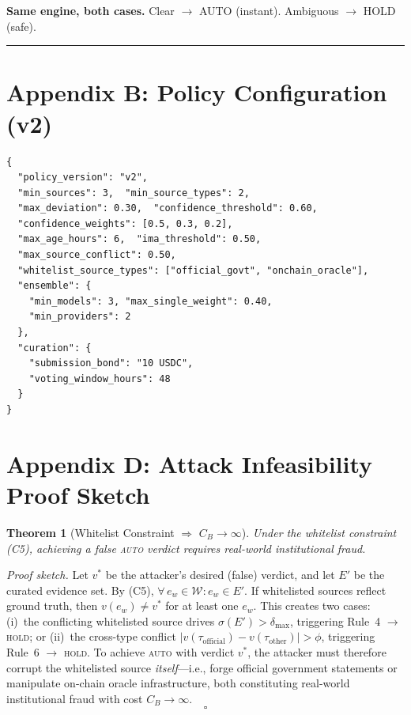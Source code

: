 \documentclass[11pt,a4paper,twocolumn]{article}
\begin{document}
\noindent\textbf{Same engine, both cases.} Clear $\to$ AUTO (instant). Ambiguous $\to$ HOLD (safe).

\bigskip
\hrule
\section*{Appendix B: Policy Configuration (v2)}

\begin{lstlisting}[language={}]
{
  "policy_version": "v2",
  "min_sources": 3,  "min_source_types": 2,
  "max_deviation": 0.30,  "confidence_threshold": 0.60,
  "confidence_weights": [0.5, 0.3, 0.2],
  "max_age_hours": 6,  "ima_threshold": 0.50,
  "max_source_conflict": 0.50,
  "whitelist_source_types": ["official_govt", "onchain_oracle"],
  "ensemble": {
    "min_models": 3, "max_single_weight": 0.40,
    "min_providers": 2
  },
  "curation": {
    "submission_bond": "10 USDC",
    "voting_window_hours": 48
  }
}
\end{lstlisting}


\section*{Appendix D: Attack Infeasibility Proof Sketch}

\textbf{Theorem 1} (Whitelist Constraint $\Rightarrow$ $C_B \to \infty$).
\textit{Under the whitelist constraint (C5), achieving a false \textsc{auto} verdict requires real-world institutional fraud.}

\smallskip\noindent\textit{Proof sketch.}
Let $v^*$ be the attacker's desired (false) verdict, and let $E'$ be the curated evidence set. By (C5), $\forall\, e_w \in \mathcal{W}: e_w \in E'$. If whitelisted sources reflect ground truth, then $v(e_w) \neq v^*$ for at least one $e_w$. This creates two cases: (i)~the conflicting whitelisted source drives $\sigma(E') > \delta_{\max}$, triggering Rule~4 $\to$ \textsc{hold}; or (ii)~the cross-type conflict $|v(\tau_{\text{official}}) - v(\tau_{\text{other}})| > \phi$, triggering Rule~6 $\to$ \textsc{hold}. To achieve \textsc{auto} with verdict $v^*$, the attacker must therefore corrupt the whitelisted source \emph{itself}---i.e., forge official government statements or manipulate on-chain oracle infrastructure, both constituting real-world institutional fraud with cost $C_B \to \infty$. \hfill$$\square$$
\end{document}
